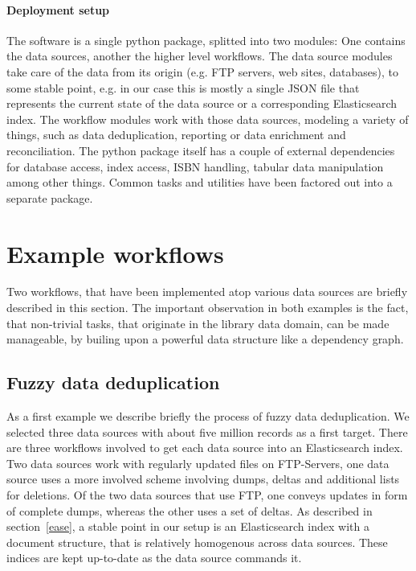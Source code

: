 \documentclass[english]{lni}
\begin{document}
\paragraph{Deployment setup}

The software is a single python package, splitted into two modules: One contains
the data sources, another the higher level workflows. The data source
modules take care of the data from its origin (e.g. FTP servers, web sites, databases),
to some stable point, e.g. in our case this is mostly a single JSON file that
represents the current state of the data source or a corresponding Elasticsearch index.
The workflow modules work
with those data sources, modeling a variety of things, such as data deduplication,
reporting or data enrichment and reconciliation. The python package itself
has a couple of external dependencies for database access, index access,
ISBN handling, tabular data manipulation among other things. Common tasks
and utilities have been factored out into a separate package.

\section{Example workflows}
\label{examples}

Two workflows, that have been implemented atop various data sources are
briefly described in this section. The important observation in both examples
is the fact, that non-trivial tasks, that originate in the library data domain,
can be made manageable, by builing upon a powerful data structure like
a dependency graph.

\subsection{Fuzzy data deduplication}

As a first example we describe briefly the process of fuzzy data deduplication.
We selected three data sources with about five million records as a first target.
There are three workflows involved to get each data source
into an Elasticsearch index. Two data sources work with regularly updated
files on FTP-Servers, one data source uses a more involved scheme involving
dumps, deltas and additional lists for deletions. Of the two data sources that use
FTP, one conveys updates in form of complete dumps, whereas the other uses
a set of deltas. As described in section~\ref{ease}, a stable point in our setup
is an Elasticsearch index with a document structure, that is relatively homogenous
across data sources. These indices are kept up-to-date as the data source commands it.
\end{document}
